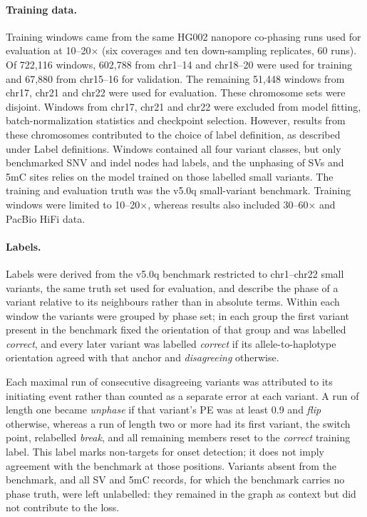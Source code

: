 \documentclass[11pt,a4paper]{article}
\begin{document}
\paragraph{Training data.} Training windows came from the same HG002 nanopore co-phasing runs used for evaluation at 10--20$\times$ (six coverages and ten down-sampling replicates, 60 runs).  Of 722,116 windows, 602,788 from chr1--14 and chr18--20 were used for training and 67,880 from chr15--16 for validation. The remaining 51,448 windows from chr17, chr21 and chr22 were used for evaluation. These chromosome sets were disjoint. Windows from chr17, chr21 and chr22 were excluded from model fitting, batch-normalization statistics and checkpoint selection. However, results from these chromosomes contributed to the choice of label definition, as described under Label definitions.  Windows contained all four variant classes, but only benchmarked SNV and indel nodes had labels, and the unphasing of SVs and 5mC sites relies on the model trained on those labelled small variants.  The training and evaluation truth was the v5.0q small-variant benchmark.  Training windows were limited to 10--20$\times$, whereas results also included 30--60$\times$ and PacBio HiFi data.

\paragraph{Labels.} Labels were derived from the v5.0q benchmark restricted to chr1--chr22 small variants, the same truth set used for evaluation, and describe the phase of a variant relative to its neighbours rather than in absolute terms. Within each window the variants were grouped by phase set; in each group the first variant present in the benchmark fixed the orientation of that group and was labelled \emph{correct}, and every later variant was labelled \emph{correct} if its allele-to-haplotype orientation agreed with that anchor and \emph{disagreeing} otherwise.

Each maximal run of consecutive disagreeing variants was attributed to its initiating event rather than counted as a separate error at each variant. A run of length one became \emph{unphase} if that variant's PE was at least 0.9 and \emph{flip} otherwise, whereas a run of length two or more had its first variant, the switch point, relabelled \emph{break}, and all remaining members reset to the \emph{correct} training label. This label marks non-targets for onset detection; it does not imply agreement with the benchmark at those positions. Variants absent from the benchmark, and all SV and 5mC records, for which the benchmark carries no phase truth, were left unlabelled: they remained in the graph as context but did not contribute to the loss.
\end{document}
